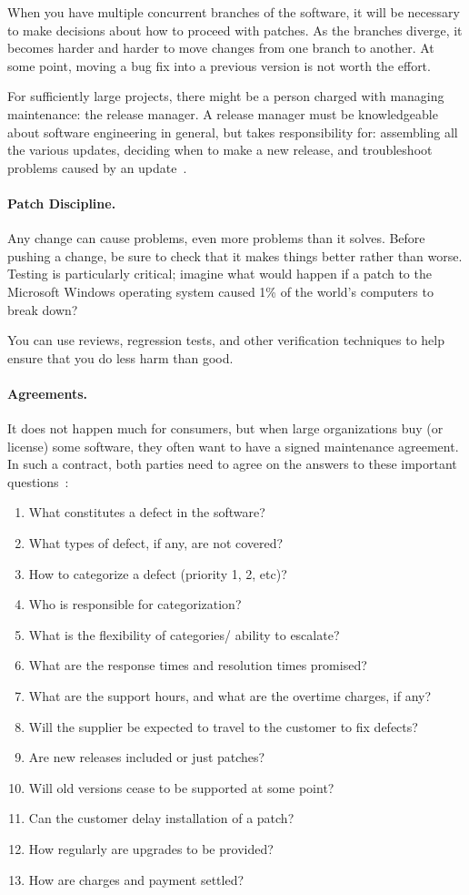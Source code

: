 When you have multiple concurrent branches of the software, it will be necessary to make decisions about how to proceed with patches. As the branches diverge, it becomes harder and harder to move changes from one branch to another. At some point, moving a bug fix into a previous version is not worth the effort.

For sufficiently large projects, there might be a person charged with managing maintenance: the release manager. A release manager must be knowledgeable about software engineering in general, but takes responsibility for: assembling all the various updates, deciding when to make a new release, and troubleshoot problems caused by an update~\cite{relman}.

\paragraph{Patch Discipline.} Any change can cause problems, even
more problems than it solves. Before pushing a change, be sure to
check that it makes things better rather than worse. Testing is
particularly critical; imagine what would happen if a patch to the
Microsoft Windows operating system caused 1\% of the world's computers
to break down?

You can use reviews, regression tests, and other verification
techniques to help ensure that you do less harm than good.

\paragraph{Agreements.}
It does not happen much for consumers, but when large organizations buy (or license) some software, they often want to have a signed maintenance agreement. In such a contract, both parties need to agree on the answers to these important questions~\cite{outlaw}:

\begin{enumerate}
	\item What constitutes a defect in the software?
	\item What types of defect, if any, are not covered?
	\item How to categorize a defect (priority 1, 2, etc)?
	\item Who is responsible for categorization?
	\item What is the flexibility of categories/ ability to escalate?
	\item What are the response times and resolution times promised?
	\item What are the support hours, and what are the overtime charges, if any?
	\item Will the supplier be expected to travel to the customer to fix defects?
	\item Are new releases included or just patches?
	\item Will old versions cease to be supported at some point?
	\item Can the customer delay installation of a patch?
	\item How regularly are upgrades to be provided?
	\item How are charges and payment settled?
\end{enumerate}

